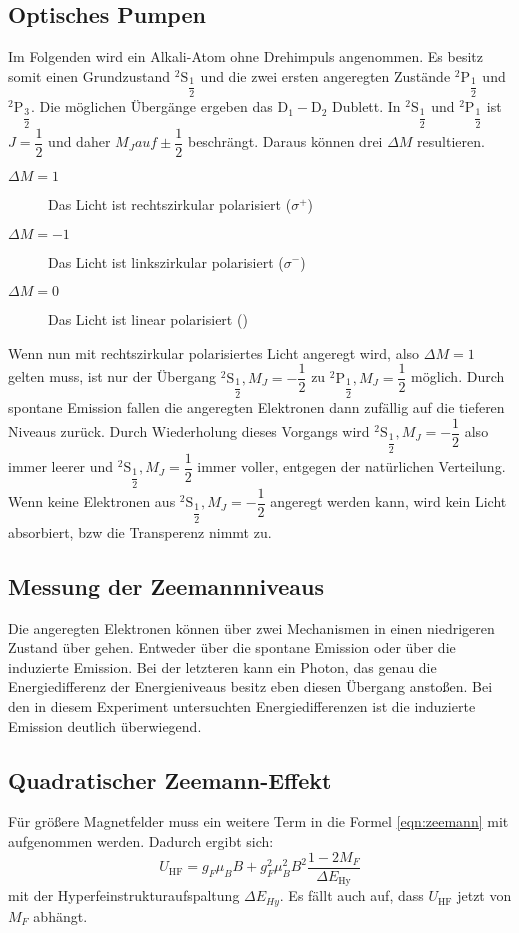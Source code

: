 \subsection{Optisches Pumpen}
Im Folgenden wird ein Alkali-Atom ohne Drehimpuls angenommen. Es besitz somit einen Grundzustand ${}^2\mathrm{S}_\dfrac{1}{2}$ und die zwei ersten angeregten Zustände ${}^2\mathrm{P}_\dfrac{1}{2}$ und ${}^2\mathrm{P}_\dfrac{3}{2}$. Die möglichen Übergänge ergeben das $\mathrm{D}_1-\mathrm{D}_2$ Dublett.
In ${}^2\mathrm{S}_\dfrac{1}{2}$ und ${}^2\mathrm{P}_\dfrac{1}{2}$ ist $J=\dfrac{1}{2}$ und daher $M_J auf \pm \dfrac{1}{2}$ beschrängt. Daraus können drei $\Delta M$ resultieren.
\begin{description}
	\item[$\Delta M=1$] Das Licht ist rechtszirkular polarisiert ($\sigma^{+}$)
	\item[$\Delta M=-1$] Das Licht ist linkszirkular polarisiert ($\sigma^{-}$)
	\item[$\Delta M=0$] Das Licht ist linear polarisiert (\pi)
\end{description}
Wenn nun mit rechtszirkular polarisiertes Licht angeregt wird, also $\Delta M=1$ gelten muss, ist nur der Übergang ${}^2\mathrm{S}_\dfrac{1}{2}, M_J=-\dfrac{1}{2}$ zu ${}^2\mathrm{P}_\dfrac{1}{2}, M_J=\dfrac{1}{2}$ möglich. Durch spontane Emission fallen die angeregten Elektronen dann zufällig auf die tieferen Niveaus zurück.
Durch Wiederholung dieses Vorgangs wird ${}^2\mathrm{S}_\dfrac{1}{2}, M_J=-\dfrac{1}{2}$ also immer leerer und ${}^2\mathrm{S}_\dfrac{1}{2},M_J=\dfrac{1}{2}$ immer voller, entgegen der natürlichen Verteilung. Wenn keine Elektronen aus ${}^2\mathrm{S}_\dfrac{1}{2}, M_J=-\dfrac{1}{2}$ angeregt werden kann, wird kein Licht absorbiert, bzw die Transperenz nimmt zu.
\subsection{Messung der Zeemannniveaus}
Die angeregten Elektronen können über zwei Mechanismen in einen niedrigeren Zustand über gehen. Entweder über die spontane Emission oder über die induzierte Emission. Bei der letzteren kann ein Photon, das genau die Energiedifferenz der Energieniveaus besitz eben diesen Übergang anstoßen. Bei den in diesem Experiment untersuchten Energiedifferenzen ist die induzierte Emission deutlich überwiegend.
\subsection{Quadratischer Zeemann-Effekt}
Für größere Magnetfelder muss ein weitere Term in die Formel \eqref{eqn:zeemann} mit aufgenommen werden. Dadurch ergibt sich:
\begin{equation}
	U_\mathrm{HF}=g_F\mu_BB + g_F^2\mu_B^2B^2\frac{1-2M_F}{\Delta E_\mathrm{Hy}}
\end{equation}
mit der Hyperfeinstrukturaufspaltung $\Delta E_{Hy}$. Es fällt auch auf, dass $U_\mathrm{HF}$ jetzt von $M_F$ abhängt.
